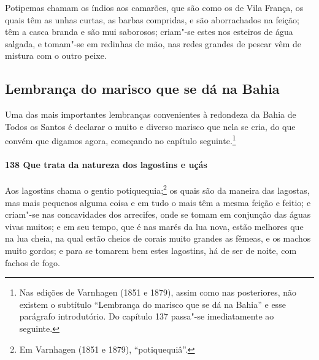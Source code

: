 Potipemas chamam os índios aos camarões, que são como os de Vila França, os quais têm as
unhas curtas, as barbas compridas, e são aborrachados na feição; têm a casca branda e são
mui saborosos; criam"-se estes nos esteiros de água salgada, e tomam"-se em redinhas de mão,
nas redes grandes de pescar vêm de mistura com o outro peixe.

\subsection{Lembrança do marisco que se dá na Bahia}

Uma das mais importantes lembranças convenientes à redondeza da Bahia de Todos os Santos é
declarar o muito e diverso marisco que nela se cria, do que convém que digamos agora,
começando no capítulo seguinte.\footnote{ Nas edições de Varnhagen (1851 e 1879), assim
como nas posteriores, não existem o subtítulo ``Lembrança do marisco que se dá na Bahia''
e esse parágrafo introdutório. Do capítulo 137 passa"-se imediatamente ao seguinte.}

\paragraph{138 Que trata da natureza dos lagostins e uçás}

Aos lagostins chama o gentio potiquequia;\footnote{ Em Varnhagen (1851 e 1879),
``potiquequiâ''.} os quais são da maneira das lagostas, mas mais pequenos alguma coisa e
em tudo o mais têm a mesma feição e feitio; e criam"-se nas concavidades dos arrecifes,
onde se tomam em conjunção das águas vivas muitos; e em seu tempo, que é nas marés da lua
nova, estão melhores que na lua cheia, na qual estão cheios de corais muito grandes as
fêmeas, e os machos muito gordos; e para se tomarem bem estes lagostins, há de ser de
noite, com fachos de fogo.

